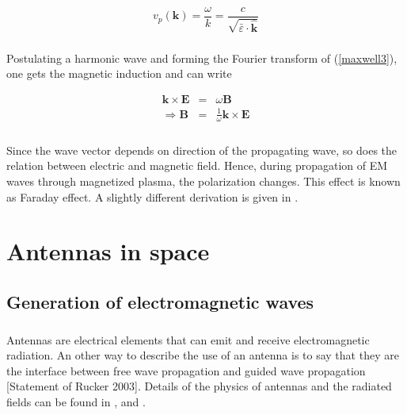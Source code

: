 \documentclass[a4paper,10pt]{thesis}
\begin{document}
\begin{equation}\label{phasespeed_magnetoplasma}
    v_p(\mathbf{k})=\frac{\omega}{k}= \frac{c}{ \sqrt{\bar{\varepsilon}\cdot \mathbf{\hat{k}}}}
\end{equation}

\paragraph*{}
Postulating a harmonic wave and forming the Fourier transform of (\ref{maxwell3}), one gets the magnetic induction and can write

\begin{eqnarray}
\mathbf{k} \times \mathbf{E}&=&\omega \mathbf{B}\\
\Rightarrow \mathbf{B}&=&\frac{1}{\omega} \mathbf{k} \times \mathbf{E}
\end{eqnarray}

\paragraph*{}
Since the wave vector depends on direction of the propagating wave, so does the relation between electric and magnetic field. Hence, during propagation of EM waves through magnetized plasma, the polarization changes. This effect is known as Faraday effect. A slightly different derivation is given in \cite{leitinger}.

\chapter{\textbf{Antennas in space}}

\section{\textbf{Generation of electromagnetic waves}}
\paragraph*{}
Antennas are electrical elements that can emit and receive electromagnetic radiation. An other way to describe the use of an antenna is to say that they are the interface between free wave propagation and guided wave propagation [Statement of Rucker 2003]. Details of the physics of antennas and the radiated fields can be found in \cite{grant}, \cite{emwaves} and \cite{jackson}.
\end{document}
